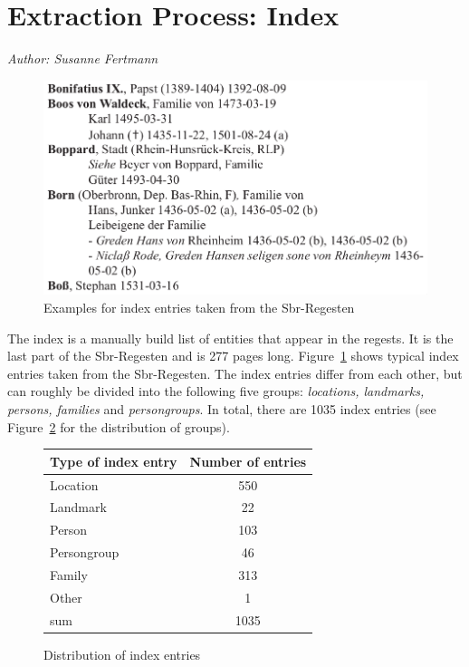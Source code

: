 \section{Extraction Process: Index}
\label{sec:index}

\emph{Author: Susanne Fertmann} \\

\begin{figure}[h]
  \centering
  \includegraphics[scale=0.3]{img/index-examples}
  \caption{Examples for index entries taken from the Sbr-Regesten}
  \label{fig:index-examples}
\end{figure}
The index is a manually build list of entities that appear in the regests. It is the last part of the Sbr-Regesten and is 277 pages long. Figure~\ref{fig:index-examples} shows typical index entries taken from the Sbr-Regesten. The index entries differ from each other, but can roughly be divided into the following five groups: \textit{locations, landmarks, persons, families} and \textit{persongroups}. In total, there are 1035 index entries (see Figure~\ref{fig:type-table} for the distribution of groups). 

\begin{figure}[h]
\centering
\begin{tabular}{|l|c|}
\hline
Type of index entry & Number of entries  \\
\hline
Location            & 550 \\
Landmark            & 22  \\
Person              & 103 \\
Persongroup         & 46  \\
Family              & 313 \\
Other               & 1   \\
\hline
sum         & 1035\\
\hline
\end{tabular} 
\caption{Distribution of index entries}
\label{fig:type-table}
\end{figure}

